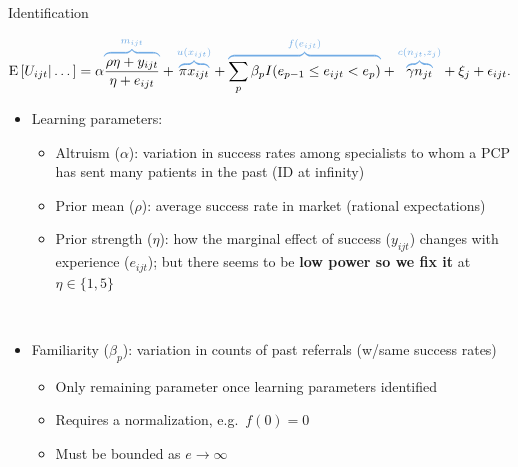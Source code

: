 \documentclass[slides, aspectratio=169]{beamer}
\newcommand{\bit}{\begin{itemize}}
\newcommand{\eit}{\end{itemize}}
\begin{document}
\begin{frame}[t]{Identification} \label{identification}

\vskip-24pt

\begin{equation*}
    \text{E} \left[ U_{ijt} | \dots \right] =
    \alpha {\color{spiritblue} \overbrace{\color{black} \frac{\rho \eta + y_{ijt}}{\eta + e_{ijt}} }^{m_{ijt}} }
    + {\color{spiritblue} \overbrace{ \color{black} \pi x_{ijt} }^{u(x_{ijt})} }
    + {\color{spiritblue} \overbrace{\color{black} \sum_{p}\beta_{p} I(e_{p-1}\leq e_{ijt} < e_{p}) }^{f(e_{ijt})} }
    + {\color{spiritblue} \overbrace{\color{black} \gamma n_{jt} }^{c(n_{jt}, z_j)} } + \xi_j + \epsilon_{ijt} .
\end{equation*}

\vskip-6pt

\begin{itemize}
    
\item Learning parameters:
\bit
    \item Altruism ($\alpha$): variation in success rates among specialists to whom a PCP has sent many patients in the past (ID at infinity)    
    \item Prior mean ($\rho$): average success rate in market (rational expectations)
    \item Prior strength ($\eta$): how the marginal effect of success ($y_{ijt}$) changes with experience ($e_{ijt}$);
    but there seems to be \textbf{low power so we fix it} at $\eta \in \{1,5\}$
\eit
\ \hyperlink{identification details}{}
\medskip \pause

\item Familiarity ($\beta_{p}$): variation in counts of past referrals (w/same success rates)
\bit
    \item Only remaining parameter once learning parameters identified
    \item Requires a normalization, e.g.~$f(0) = 0$
    \item Must be bounded as $e \rightarrow \infty$
\eit


\end{itemize}

\end{frame}
\end{document}
